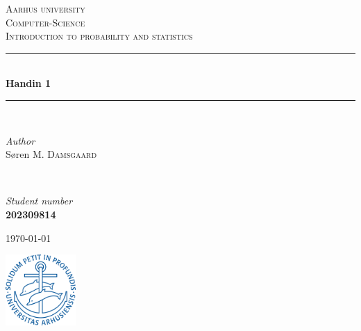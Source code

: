 \documentclass[12pt]{article}
\begin{document}
\begin{titlepage}
\newcommand{\HRule}{\rule{\linewidth}{0.5mm}}
\center

\textsc{\LARGE Aarhus university}\\[1.5cm]
\textsc{\Large Computer-Science}\\[0.5cm]
\textsc{\large Introduction to probability and statistics}\\[0.5cm]
    

\HRule\\[0.4cm]
	
	{\huge\bfseries Handin 1 }\\[0.4cm] %
	
\HRule\\[1.5cm]

\begin{minipage}{0.4\textwidth}
		\begin{flushleft}
			\large
			\textit{Author}\\
			Søren M. \textsc{Damsgaard}\\
		\end{flushleft}
	\end{minipage}
~
	\begin{minipage}{0.4\textwidth}
		\begin{flushright}
			\large
			\textit{Student number}\\
			\textbf{202309814}\\
			
		\end{flushright}
	\end{minipage}

\vfill\vfill\vfill %
	
	{\large\today}

\vfill\vfill
	\includegraphics[width=0.2\textwidth]{Aarhus_University_seal.png}\\[1cm] %
	 

\vfill
\end{titlepage}
\hspace{0.02cm}
\end{document}
